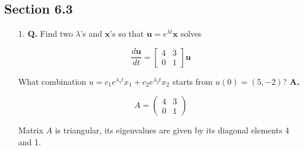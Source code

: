 \documentclass[main.tex]{subfiles}
\begin{document}
\subsection{Section 6.3}
\begin{enumerate}
    \item [1.] \textbf{Q.} Find two $\lambda$'s and $\boldsymbol{x}$'s so that $\boldsymbol{u}=e^{\lambda t} \boldsymbol{x}$ solves
    
    $$
    \frac{d \boldsymbol{u}}{d t}=\left[\begin{array}{ll}
    4 & 3 \\
    0 & 1
    \end{array}\right] \boldsymbol{u}
    $$
    
    What combination $u=c_{1} e^{\lambda_{1} t} x_{1}+c_{2} e^{\lambda_{2} t} x_{2}$ starts from $u(0)=(5,-2)$? 
    \textbf{A.}

     $$
    A=\left(\begin{array}{ll}
    4 & 3 \\
    0 & 1
    \end{array}\right)
    $$

    Matrix $A$ is triangular, its eigenvalues are given by its diagonal elements 4 and 1.


\end{enumerate}
\end{document}
